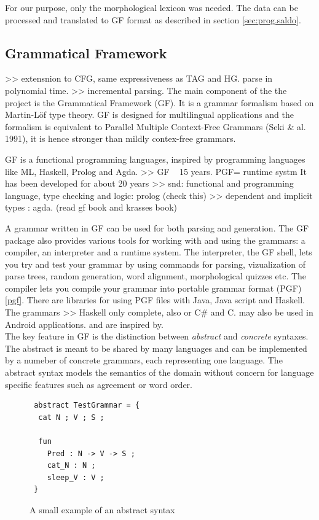 \documentclass{report}
\begin{document}
For our purpose, only the morphological lexicon was needed.
The data can be processed and translated to GF format as described in 
section \ref{sec:prog.saldo}.

\subsection{Grammatical Framework}
>> extensnion to CFG, same expressiveness as TAG and HG. parse in polynomial time.
>> incremental parsing.
The main component of the the project is the Grammatical Framework\cite{gfbok} (GF). It is
a grammar formalism based on Martin-Löf type theory\cite{martinlof}. GF is
designed for multilingual applications and the formalism is equivalent to
Parallel Multiple Context-Free Grammars (Seki \& al. 1991), it is hence
stronger than mildly contex-free grammars. 

GF is a functional programming languages, inspired by programming languages
like ML\cite{ml}, Haskell\cite{haskell}, Prolog\cite{bratko} and
Agda\cite{agda}. 
>> GF ~ 15 years. PGF= runtime systm
It has been developed for about 20 years 
>> snd: functional and programming language, type checking and logic: prolog (check this)
>> dependent and implicit types : agda. (read gf book and krasses book)

A grammar written in GF can be used for both parsing and generation.
The GF package also provides various tools for working with and using the grammars:
a compiler, an interpreter and a runtime system. The interpreter, the GF shell, lets
you try and test your grammar by using commands for parsing, vizualization of parse trees,
random generation, word alignment, morphological quizzes etc.
The compiler lets you compile your grammar into portable grammar format (PGF)\ref{pgf}.
There are libraries for using PGF files with Java, Java script and Haskell. The grammars
>> Haskell only complete, also or C\# and C. 
may also be used in Android applications.
and are inspired by.\\


The key feature in GF is the distinction between
\textit{abstract} and \textit{concrete} syntaxes. The abstract is meant to be
shared by many languages and can be implemented by a numeber of concrete grammars,
each representing one language. The abstract syntax models the semantics of the
domain without concern for language specific features such as agreement or word
order.

\begin{figure}[h]
\begin{verbatim}
 abstract TestGrammar = {
  cat N ; V ; S ;

  fun 
    Pred : N -> V -> S ;
    cat_N : N ;
    sleep_V : V ;
 }
\end{verbatim}
\caption{A small example of an abstract syntax}
\label{fig:gfAbstract1}
\end{figure}
\end{document}
